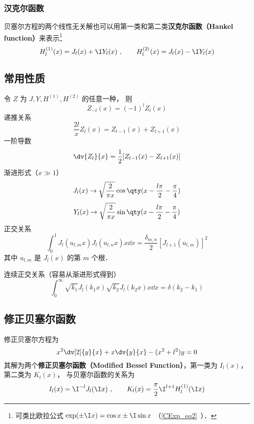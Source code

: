\subsubsection{汉克尔函数}
贝塞尔方程的两个线性无关解也可以用第一类和第二类\textbf{汉克尔函数（Hankel function）}来表示\footnote{可类比欧拉公式 $\exp(\pm\I x) = \cos x \pm \I\sin x$ （\autoref{CExp_eq2}~）．}
\begin{equation}
H_l ^{(1)}(x) = J_l(x) + \I Y_l(x)~,
\qquad
H_l ^{(2)}(x) = J_l(x) - \I Y_l(x)
\end{equation}

\subsection{常用性质}
令 $Z$ 为 $J, Y, H^{(1)}, H^{(2)}$ 的任意一种， 则
\begin{equation}
Z_{-l}(x) = (-1)^l Z_l(x)
\end{equation}
递推关系
\begin{equation}
\frac{2l}{x} Z_l(x) = Z_{l -1}(x) + Z_{l+1}(x)
\end{equation}
一阶导数
\begin{equation}
\dv{Z_l}{x} = \frac12 [Z_{l  - 1}(x) - Z_{l +1}(x)]
\end{equation}
渐进形式（$x \gg 1$）
\begin{equation}
J_l(x) \to \sqrt{\frac{2}{\pi x}} \cos\qty(x - \frac{l\pi}{2} - \frac{\pi}{4})
\end{equation}
\begin{equation}
Y_l(x) \to \sqrt{\frac{2}{\pi x}} \sin\qty(x - \frac{l\pi}{2} - \frac{\pi}{4})
\end{equation}
正交关系
\begin{equation}
\int_0^1 J_l (u_{l ,m} x) J_l (u_{l ,n} x) x \dd{x} = \frac{\delta_{m,n}}{2}[J_{l + 1} (u_{l ,m})]^2
\end{equation}
其中 $u_{l, m}$ 是 $J_l(x)$ 的第 $m$ 个根．

连续正交关系（容易从渐进形式得到）
\begin{equation}
\int_0^\infty \sqrt{k_1} J_l (k_1 x) \sqrt{k_2}J_l (k_2 x) x \dd{x} = \delta(k_2 - k_1)
\end{equation}

\subsection{修正贝塞尔函数}
修正贝塞尔方程为
\begin{equation}
x^2 \dv[2]{y}{x} + x \dv{y}{x} - (x^2 + l ^2)y = 0
\end{equation}
其解为两个\textbf{修正贝塞尔函数（Modified Bessel Function）}，第一类为 $I_l(x)$，  第二类为 $K_l(x)$，  与贝塞尔函数的关系为
\begin{equation}\label{Bessel_eq2}
I_l(x) = \I^{-l} J_l(\I x)~,
\qquad
K_l(x) = \frac{\pi}{2} \I^{l  + 1} H_l ^{(1)}(\I x)
\end{equation}
